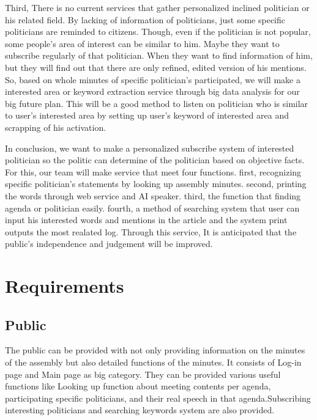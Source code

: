\documentclass[conference]{IEEEtran}
\begin{document}
Third, There is no current services that gather personalized inclined politician or his related field. By lacking of information of politicians, just some specific politicians are reminded to citizens. Though, even if the politician is not popular, some people’s area of interest can be similar to him. Maybe they want to subscribe regularly of that politician. When they want to find information of him, but they will find out that there are only refined, edited version of his mentions. So, based on whole minutes of specific politician’s participated, we will make a interested area or keyword extraction service through big data analysis for our big future plan. This will be a good method to listen on politician who is similar to user’s interested area by setting up user’s keyword of interested area and scrapping of his activation.
 
In conclusion, we want to make a  personalized subscribe system of interested politician so the politic can determine of the politician based on objective facts. For this, our team will make service that meet four functions. first, recognizing specific politician’s statements by looking up assembly minutes. second, printing the words through web service and AI speaker. third, the function that finding agenda or politician easily. fourth, a method of searching system that user can input his interested words and mentions in the article and the system print outputs the most realated log. Through this service, It is anticipated that the public’s independence and judgement will be improved.
 
 
\section{Requirements}
\subsection{Public}

The public can be provided with  not only providing information on the minutes of the assembly but also detailed functions of the minutes. It consists of Log-in page and Main page as big category. They can be provided various useful functions like Looking up function about meeting contents per agenda, participating specific politicians, and their real speech in that agenda.Subscribing interesting politicians and searching keywords system are also provided. \\ 
 
\end{document}
